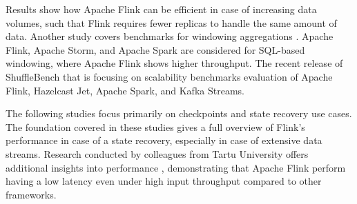 Results show how Apache Flink can be efficient in case of increasing data volumes,
such that Flink requires fewer replicas to handle the same amount of data.
Another study covers benchmarks for windowing aggregations \cite{dataSystemBenchmarks}.
Apache Flink, Apache Storm, and Apache Spark are considered for SQL-based windowing, where Apache Flink shows higher throughput.
The recent release of ShuffleBench \cite{Henning_2024} that is focusing on scalability
benchmarks evaluation of Apache Flink, Hazelcast Jet, Apache Spark, and Kafka Streams.

The following studies \cite{carbone2015lightweight} \cite{siachamis2024checkmate} focus
primarily on checkpoints and state recovery use cases.
The foundation covered in these studies gives a full overview of Flink's performance in
case of a state recovery, especially in case of extensive data streams.
Research conducted by colleagues from Tartu University offers additional insights into performance \cite{bencmarks_big_data},
demonstrating that Apache Flink perform having a low latency even under high input throughput compared to other frameworks.
